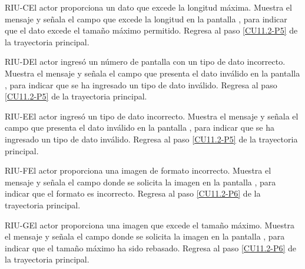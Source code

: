 	\begin{UCtrayectoriaA}{RIU-C}{El actor proporciona un dato que excede la longitud máxima.}
		\UCpaso[\UCsist] Muestra el mensaje  y señala el campo que excede la longitud en la pantalla , para indicar que el dato excede el tamaño máximo permitido.
		\UCpaso Regresa al paso \ref{CU11.2-P5} de la trayectoria principal.
	\end{UCtrayectoriaA}

	\begin{UCtrayectoriaA}{RIU-D}{El actor ingresó un número de pantalla con un tipo de dato incorrecto.}
		\UCpaso[\UCsist] Muestra el mensaje  y señala el campo que presenta el dato inválido en la pantalla , para indicar que se ha ingresado un tipo de dato inválido.
		\UCpaso Regresa al paso \ref{CU11.2-P5} de la trayectoria principal.
	\end{UCtrayectoriaA}
	
	\begin{UCtrayectoriaA}{RIU-E}{El actor ingresó un tipo de dato incorrecto.}
		\UCpaso[\UCsist] Muestra el mensaje  y señala el campo que presenta el dato inválido en la pantalla , para indicar que se ha ingresado un tipo de dato inválido.
		\UCpaso Regresa al paso \ref{CU11.2-P5} de la trayectoria principal.
	\end{UCtrayectoriaA}

	\begin{UCtrayectoriaA}{RIU-F}{El actor proporciona una imagen de formato incorrecto.}
		\UCpaso[\UCsist] Muestra el mensaje  y señala el campo donde se solicita la imagen en la pantalla , para indicar que el formato es incorrecto.
		\UCpaso Regresa al paso \ref{CU11.2-P6} de la trayectoria principal.
	\end{UCtrayectoriaA}

	\begin{UCtrayectoriaA}{RIU-G}{El actor proporciona una imagen que excede el tamaño máximo.}
		\UCpaso[\UCsist] Muestra el mensaje  y señala el campo donde se solicita la imagen en la pantalla , para indicar que el tamaño máximo ha sido rebasado.
		\UCpaso Regresa al paso \ref{CU11.2-P6} de la trayectoria principal.
	\end{UCtrayectoriaA}
	
